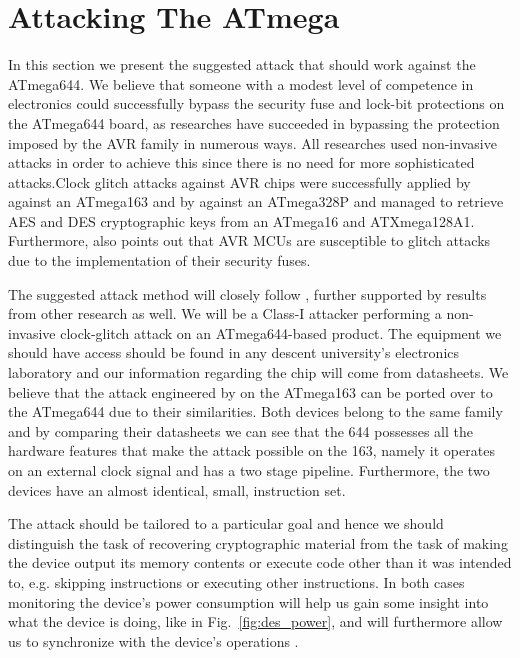\section{Attacking The ATmega}
\label{sec:attacking_mega}

In this section we present the suggested attack that should work against the ATmega644. We believe that someone with a modest level of competence in electronics could successfully bypass the security fuse and lock-bit protections on the ATmega644 board, as researches have succeeded in bypassing the protection imposed by the AVR family in numerous ways. All researches used non-invasive attacks in order to achieve this since there is no need for more sophisticated attacks.Clock glitch attacks against AVR chips were successfully applied by \citep{glitches_paper} against an ATmega163 and by \citep{chipwhisperer} against an ATmega328P and \citep{avr_mega} managed to retrieve AES and DES cryptographic keys from an ATmega16 and ATXmega128A1. Furthermore, \citep{sergei:thesis} also points out that AVR MCUs are susceptible to glitch attacks due to the implementation of their security fuses. 

The suggested attack method will closely follow \citep{glitches_paper}, further supported by results from other research as well. We will be a Class-I attacker performing a non-invasive clock-glitch attack on an ATmega644-based product. The equipment we should have access should be found in any descent university's electronics laboratory and our information regarding the chip will come from datasheets. We believe that the attack engineered by \citep{glitches_paper} on the ATmega163 can be ported over to the ATmega644 due to their similarities. Both devices belong to the same family and by comparing their datasheets we can see that the 644 possesses all the hardware features that make the attack possible on the 163, namely it operates on an external clock signal and has a two stage pipeline\citep{glitches_paper}. Furthermore, the two devices have an almost identical, small, instruction set.

The attack should be tailored to a particular goal and hence we should distinguish the task of recovering cryptographic material from the task of making the device output its memory contents or execute code other than it was intended to, e.g. skipping instructions or executing other instructions. In both cases monitoring the device's power consumption will help us gain some insight into what the device is doing, like in Fig.~\ref{fig:des_power}, and will furthermore allow us to synchronize with the device's operations \citep{sergei:thesis}\citep{avr_mega}. 

